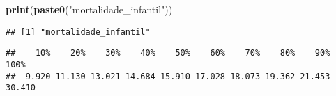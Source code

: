 \documentclass[
]{article}
\newenvironment{Shaded}{\begin{snugshade}}{\end{snugshade}}
\newcommand{\AttributeTok}[1]{\textcolor[rgb]{0.13,0.29,0.53}{#1}}
\newcommand{\DecValTok}[1]{\textcolor[rgb]{0.00,0.00,0.81}{#1}}
\newcommand{\FunctionTok}[1]{\textcolor[rgb]{0.13,0.29,0.53}{\textbf{#1}}}
\newcommand{\NormalTok}[1]{#1}
\newcommand{\SpecialCharTok}[1]{\textcolor[rgb]{0.81,0.36,0.00}{\textbf{#1}}}
\newcommand{\StringTok}[1]{\textcolor[rgb]{0.31,0.60,0.02}{#1}}
\begin{document}
\begin{Shaded}
\begin{Highlighting}[]
\FunctionTok{print}\NormalTok{(}\FunctionTok{paste0}\NormalTok{(}\StringTok{"mortalidade\_infantil"}\NormalTok{))}
\end{Highlighting}
\end{Shaded}

\begin{verbatim}
## [1] "mortalidade_infantil"
\end{verbatim}

\begin{Shaded}
\end{Shaded}

\begin{verbatim}
##    10%    20%    30%    40%    50%    60%    70%    80%    90%   100% 
##  9.920 11.130 13.021 14.684 15.910 17.028 18.073 19.362 21.453 30.410
\end{verbatim}

\begin{Shaded}
\end{Shaded}
\end{document}
